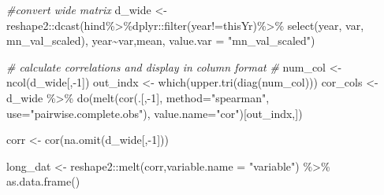 \documentclass[
]{article}
\newenvironment{Shaded}{\begin{snugshade}}{\end{snugshade}}
\newcommand{\AttributeTok}[1]{\textcolor[rgb]{0.77,0.63,0.00}{#1}}
\newcommand{\CommentTok}[1]{\textcolor[rgb]{0.56,0.35,0.01}{\textit{#1}}}
\newcommand{\DecValTok}[1]{\textcolor[rgb]{0.00,0.00,0.81}{#1}}
\newcommand{\FunctionTok}[1]{\textcolor[rgb]{0.00,0.00,0.00}{#1}}
\newcommand{\NormalTok}[1]{#1}
\newcommand{\OtherTok}[1]{\textcolor[rgb]{0.56,0.35,0.01}{#1}}
\newcommand{\SpecialCharTok}[1]{\textcolor[rgb]{0.00,0.00,0.00}{#1}}
\newcommand{\StringTok}[1]{\textcolor[rgb]{0.31,0.60,0.02}{#1}}
\begin{document}
\begin{Shaded}
\begin{Highlighting}[]
      
      \CommentTok{\#convert wide matrix}
\NormalTok{      d\_wide   }\OtherTok{\textless{}{-}}\NormalTok{ reshape2}\SpecialCharTok{::}\FunctionTok{dcast}\NormalTok{(hind}\SpecialCharTok{\%\textgreater{}\%}\NormalTok{dplyr}\SpecialCharTok{::}\FunctionTok{filter}\NormalTok{(year}\SpecialCharTok{!=}\NormalTok{thisYr)}\SpecialCharTok{\%\textgreater{}\%}
                                    \FunctionTok{select}\NormalTok{(year, var, mn\_val\_scaled),}
\NormalTok{                                 year}\SpecialCharTok{\textasciitilde{}}\NormalTok{var,mean,}
                                 \AttributeTok{value.var =} \StringTok{"mn\_val\_scaled"}\NormalTok{)}
      
    
      \CommentTok{\# calculate correlations and display in column format}
      \CommentTok{\#}
\NormalTok{      num\_col  }\OtherTok{\textless{}{-}} \FunctionTok{ncol}\NormalTok{(d\_wide[,}\SpecialCharTok{{-}}\DecValTok{1}\NormalTok{])}
\NormalTok{      out\_indx }\OtherTok{\textless{}{-}} \FunctionTok{which}\NormalTok{(}\FunctionTok{upper.tri}\NormalTok{(}\FunctionTok{diag}\NormalTok{(num\_col))) }
\NormalTok{      cor\_cols }\OtherTok{\textless{}{-}}\NormalTok{ d\_wide }\SpecialCharTok{\%\textgreater{}\%}
                  \FunctionTok{do}\NormalTok{(}\FunctionTok{melt}\NormalTok{(}\FunctionTok{cor}\NormalTok{(.[,}\SpecialCharTok{{-}}\DecValTok{1}\NormalTok{], }
                              \AttributeTok{method=}\StringTok{"spearman"}\NormalTok{, }
                              \AttributeTok{use=}\StringTok{"pairwise.complete.obs"}\NormalTok{),}
                          \AttributeTok{value.name=}\StringTok{"cor"}\NormalTok{)[out\_indx,])}

\NormalTok{      corr     }\OtherTok{\textless{}{-}} \FunctionTok{cor}\NormalTok{(}\FunctionTok{na.omit}\NormalTok{(d\_wide[,}\SpecialCharTok{{-}}\DecValTok{1}\NormalTok{]))}
      
\NormalTok{      long\_dat }\OtherTok{\textless{}{-}}\NormalTok{ reshape2}\SpecialCharTok{::}\FunctionTok{melt}\NormalTok{(corr,}\AttributeTok{variable.name =} \StringTok{"variable"}\NormalTok{) }\SpecialCharTok{\%\textgreater{}\%} 
      \FunctionTok{as.data.frame}\NormalTok{() }
      

\end{Highlighting}
\end{Shaded}
\end{document}

